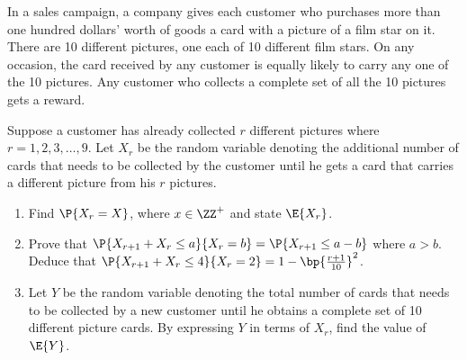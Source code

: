 \begin{problem}
    In a sales campaign, a company gives each customer who purchases more than one hundred dollars' worth of goods a card with a picture of a film star on it. There are 10 different pictures, one each of 10 different film stars. On any occasion, the card received by any customer is equally likely to carry any one of the 10 pictures. Any customer who collects a complete set of all the 10 pictures gets a reward.

    Suppose a customer has already collected $r$ different pictures where $r = 1, 2, 3, \dots, 9$. Let $X_r$ be the random variable denoting the additional number of cards that needs to be collected by the customer until he gets a card that carries a different picture from his $r$ pictures.

    \begin{enumerate}
        \item Find $\P{X_r = X}$, where $x \in \ZZ^+$ and state $\E{X_r}$.
        \item Prove that $\P{X_{r+1} + X_r \leq a}{X_r = b} = \P{X_{r+1} \leq a - b}$ where $a > b$. Deduce that $\P{X_{r+1} + X_r \leq 4}{X_r = 2} = 1 - \bp{\frac{r+1}{10}}^2$.
        \item Let $Y$ be the random variable denoting the total number of cards that needs to be collected by a new customer until he obtains a complete set of 10 different picture cards. By expressing $Y$ in terms of $X_r$, find the value of $\E{Y}$.
    \end{enumerate}
\end{problem}
